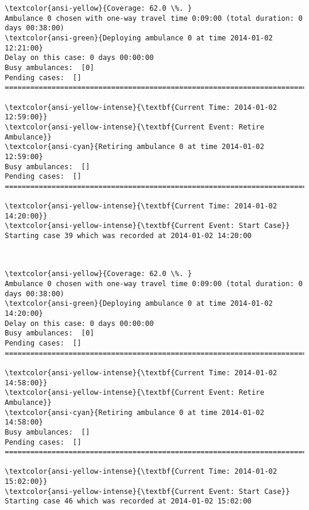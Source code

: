 \documentclass[11pt]{article}
\begin{document}
    \begin{Verbatim}[commandchars=\\\{\}]
\textcolor{ansi-yellow}{Coverage: 62.0 \%. }
Ambulance 0 chosen with one-way travel time 0:09:00 (total duration: 0 days 00:38:00)
\textcolor{ansi-green}{Deploying ambulance 0 at time 2014-01-02 12:21:00}
Delay on this case: 0 days 00:00:00
Busy ambulances:  [0]
Pending cases:  []
========================================================================

\textcolor{ansi-yellow-intense}{\textbf{Current Time: 2014-01-02 12:59:00}}
\textcolor{ansi-yellow-intense}{\textbf{Current Event: Retire Ambulance}}
\textcolor{ansi-cyan}{Retiring ambulance 0 at time 2014-01-02 12:59:00}
Busy ambulances:  []
Pending cases:  []
========================================================================

\textcolor{ansi-yellow-intense}{\textbf{Current Time: 2014-01-02 14:20:00}}
\textcolor{ansi-yellow-intense}{\textbf{Current Event: Start Case}}
Starting case 39 which was recorded at 2014-01-02 14:20:00

    \end{Verbatim}

    \begin{center}
    \end{center}
    { \hspace*{\fill} \\}
    
    \begin{Verbatim}[commandchars=\\\{\}]
\textcolor{ansi-yellow}{Coverage: 62.0 \%. }
Ambulance 0 chosen with one-way travel time 0:09:00 (total duration: 0 days 00:38:00)
\textcolor{ansi-green}{Deploying ambulance 0 at time 2014-01-02 14:20:00}
Delay on this case: 0 days 00:00:00
Busy ambulances:  [0]
Pending cases:  []
========================================================================

\textcolor{ansi-yellow-intense}{\textbf{Current Time: 2014-01-02 14:58:00}}
\textcolor{ansi-yellow-intense}{\textbf{Current Event: Retire Ambulance}}
\textcolor{ansi-cyan}{Retiring ambulance 0 at time 2014-01-02 14:58:00}
Busy ambulances:  []
Pending cases:  []
========================================================================

\textcolor{ansi-yellow-intense}{\textbf{Current Time: 2014-01-02 15:02:00}}
\textcolor{ansi-yellow-intense}{\textbf{Current Event: Start Case}}
Starting case 46 which was recorded at 2014-01-02 15:02:00

    \end{Verbatim}
\end{document}
